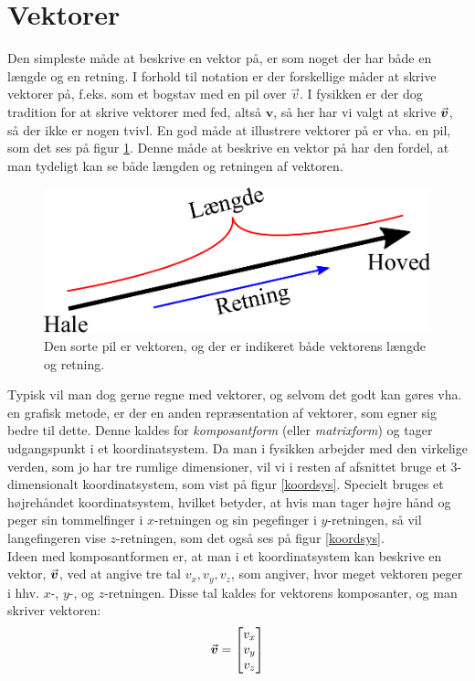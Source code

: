 \section{Vektorer}
Den simpleste måde at beskrive en vektor på, er som noget der har både en længde og en retning. I forhold til notation er der forskellige måder at skrive vektorer på, f.eks. som et bogstav med en pil over $\vec{v}$. I fysikken er der dog tradition for at skrive vektorer med fed, altså $\mathbf{v}$, så her har vi valgt at skrive ${\vec{\boldsymbol{v}}}$, så der ikke er nogen tvivl. En god måde at illustrere vektorer på er vha. en pil, som det ses på figur \ref{vektorfig}. Denne måde at beskrive en vektor på har den fordel, at man tydeligt kan se både længden og retningen af vektoren.
\begin{figure}[h!]
	\centering
	\includegraphics[scale=0.6]{matematik/fig/vektor.pdf}
	\caption{Den sorte pil er vektoren, og der er indikeret både vektorens længde og retning. }
	\label{vektorfig}
\end{figure}
Typisk vil man dog gerne regne med vektorer, og selvom det godt kan gøres vha. en grafisk metode, er der en anden repræsentation af vektorer, som egner sig bedre til dette. Denne kaldes for \emph{komposantform} (eller \emph{matrixform})  og tager udgangspunkt i et koordinatsystem. Da man i fysikken arbejder med den virkelige verden, som jo har tre rumlige dimensioner, vil vi i resten af afsnittet bruge et 3-dimensionalt koordinatsystem, som vist på figur \ref{koordsys}. Specielt bruges et højrehåndet koordinatsystem, hvilket betyder, at hvis man tager højre hånd og peger sin tommelfinger i $x$-retningen og sin pegefinger i $y$-retningen, så vil langefingeren vise $z$-retningen, som det også ses på figur \ref{koordsys}.\\
Ideen med komposantformen er, at man i et koordinatsystem kan beskrive en vektor, ${\vec{\boldsymbol{v}}}$, ved at angive tre tal $v_x,  v_y,  v_z$, som angiver, hvor meget vektoren peger i hhv. $x$-, $y$-, og $z$-retningen. Disse tal kaldes for vektorens komposanter, og man skriver vektoren:
\begin{equation}
{\vec{\boldsymbol{v}}} = \begin{bmatrix} v_x \\ v_y \\ v_z \end{bmatrix}
\end{equation}

